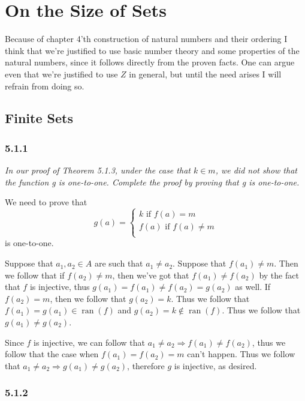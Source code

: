 \documentclass[11pt,oneside,titlepage]{book}
\DeclareMathOperator \ra {\Rightarrow}
\DeclareMathOperator \ran {ran}
\begin{document}
\chapter{On the Size of Sets}

Because of chapter 4'th construction of natural numbers and their ordering I think
that we're justified to use basic number theory and some properties of the
natural numbers, since it follows directly from the proven facts.
One can argue even that we're justified to use $Z$ in general, but until
the need arises I will refrain from doing so.

\section{Finite Sets}

\subsection*{5.1.1}

\textit{In our proof of Theorem 5.1.3, under the case that $k \in m$, we did not show
that the function g is one-to-one. Complete the proof by proving that g is
one-to-one.}

We need to prove that
$$g(a) =
\begin{cases}
  k \text{ if } f(a) = m \\
  f(a) \text{ if } f(a) \neq m \\
\end{cases}
$$
is one-to-one.

Suppose that $a_1, a_2 \in A$ are such that $a_1 \neq a_2$.
Suppose that $f(a_1) \neq m$. Then we follow that if $f(a_2) \neq m$, then
we've got that $f(a_1) \neq f(a_2)$ by the fact that $f$ is injective, thus
$g(a_1) = f(a_1) \neq f(a_2) = g(a_2)$ as well.
If $f(a_2) = m$, then we follow that $g(a_2) = k$. Thus we follow that
$f(a_1) = g(a_1) \in \ran(f)$ and $g(a_2) = k \notin \ran(f)$. Thus we follow that
$g(a_1) \neq g(a_2)$.

Since $f$ is injective, we can follow that $a_1 \neq  a_2 \ra f(a_1) \neq f(a_2)$, thus
we follow that the case when $f(a_1) = f(a_2) = m$ can't happen. Thus we follow that
$a_1 \neq a_2 \ra g(a_1) \neq g(a_2)$, therefore $g$ is injective, as desired.

\subsection*{5.1.2}
\end{document}
